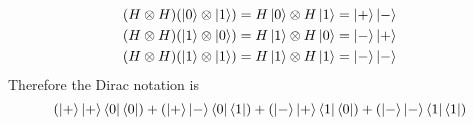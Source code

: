\documentclass[11pt]{article}
\begin{document}
\begin{enumerate}
\begin{align*}
            (H \otimes H)(\ket{0} \otimes \ket{1}) &= H\ket{0} \otimes H\ket{1} = \ket{+}\ket{-} \\
            (H \otimes H)(\ket{1} \otimes \ket{0}) &= H\ket{1} \otimes H\ket{0} = \ket{-}\ket{+} \\
            (H \otimes H)(\ket{1} \otimes \ket{1}) &= H\ket{1} \otimes H\ket{1} = \ket{-}\ket{-} \\
        \end{align*}
        Therefore the Dirac notation is 
        $$ (\ket{+}\ket{+}\bra{0}\bra{0}) + (\ket{+}\ket{-}\bra{0}\bra{1}) + (\ket{-}\ket{+} \bra{1}\bra{0}) + (\ket{-}\ket{-}\bra{1}\bra{1}) $$

\end{enumerate}

\end{document}
